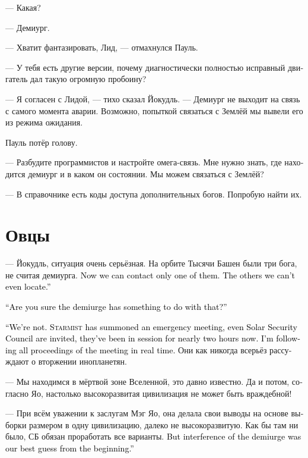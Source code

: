 \documentclass[a4paper,12pt,fleqn]{book}\usepackage{cooltooltips}\usepackage{polyglossia}\setdefaultlanguage[babelshorthands=true]{russian}\setotherlanguage{english}\defaultfontfeatures{Ligatures=TeX,Mapping=tex-text} \usepackage{xcolor}\definecolor{lightgray}{HTML}{bbbbbb}\color{lightgray}\newcommand{\ml}[3]{\textenglish{\textcolor{black}{#3}}}
\begin{document}
--- Какая?

--- Демиург.

--- Хватит фантазировать, Лид, --- отмахнулся Пауль.

--- У тебя есть другие версии, почему диагностически полностью исправный двигатель дал такую огромную пробоину?

--- Я согласен с Лидой, --- тихо сказал Йокудль.
--- Демиург не выходит на связь с самого момента аварии.
Возможно, попыткой связаться с Землёй мы вывели его из режима ожидания.

Пауль потёр голову.

--- Разбудите программистов и настройте омега-связь.
Мне нужно знать, где находится демиург и в каком он состоянии.
Мы можем связаться с Землёй?

--- В справочнике есть коды доступа дополнительных богов.
Попробую найти их.

\section{Овцы}

--- Йокудль, ситуация очень серьёзная.
На орбите Тысячи Башен были три бога, не считая демиурга.
\ml{$0$}
{Сейчас на связь выходит один.}
{Now we can contact only one of them.}
\ml{$0$}
{Прочих мы даже не можем локализовать.}
{The others we can't even locate.''}

\ml{$0$}
{--- Вы уверены, что это проделки демиурга?}
{``Are you sure the demiurge has something to do with that?''}

\ml{$0$}
{--- Сложно сказать.}
{``We're not.}
\ml{$0$}
{<<Стармист>> собрал срочный консилиум, подключили Совет Безопасности Солнечной системы, они заседают уже два часа.}
{\textsc{Starmist} has summoned an emergency meeting, even Solar Security Council are invited, they've been in session for nearly two hours now.}
\ml{$0$}
{Я слежу за ходом совещания в реальном времени.}
{I'm following all proceedings of the meeting in real time.}
Они как никогда всерьёз рассуждают о вторжении инопланетян.

--- Мы находимся в мёртвой зоне Вселенной, это давно известно.
Да и потом, согласно Яо, настолько высокоразвитая цивилизация не может быть враждебной!

--- При всём уважении к заслугам Мэг Яо, она делала свои выводы на основе выборки размером в одну цивилизацию, далеко не высокоразвитую.
Как бы там ни было, СБ обязан проработать все варианты.
\ml{$0$}
{Однако версия с демиургом была основной с самого начала.}
{But interference of the demiurge was our best guess from the beginning.''}
\end{document}
